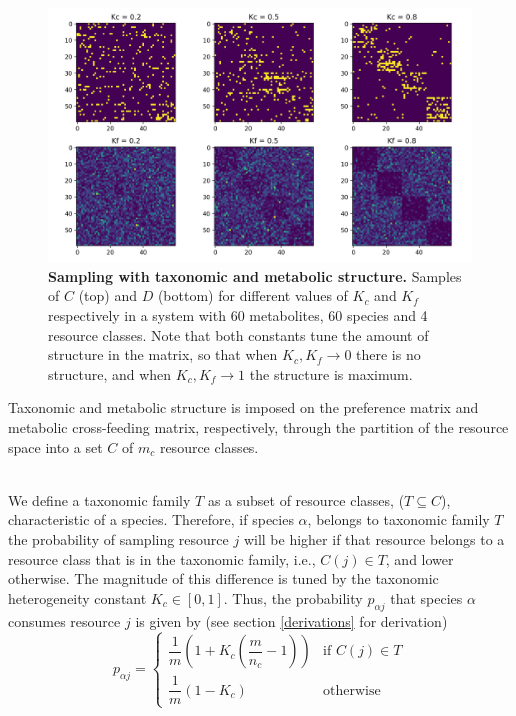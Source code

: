 \documentclass[12pt]{article}
\begin{document}
        	\begin{figure}[t]
        		\centering
        		\includegraphics[width=\textwidth]{kc_kf_guilds.png}
        		\caption{\textbf{Sampling with taxonomic and metabolic structure.} Samples of $C$ (top) and $D$ (bottom) for different values of $K_c$ and $K_f$ respectively in a system with 60 metabolites, 60 species and 4 resource classes. Note that both constants tune the amount of structure in the matrix, so that when $K_c, K_f \rightarrow 0$ there is no structure, and when $K_c, K_f \rightarrow 1$ the structure is maximum.}
        		\label{kc_kf_guilds}
        	\end{figure}
            Taxonomic and metabolic structure is imposed on the  preference matrix and metabolic cross-feeding matrix, respectively, through the partition of the resource space into a set $C$ of $m_c$ resource classes.\par\\
            We define a taxonomic family $T$ as a subset of resource classes, ($T \subseteq C$), characteristic of a species. Therefore, if species $\alpha$, belongs to taxonomic family $T$ the probability of sampling resource $j$ will be higher if  that resource belongs to a resource class that is in the taxonomic family, i.e., $C(j) \in T$, and lower otherwise. The magnitude of this difference is tuned by the taxonomic heterogeneity constant $K_c \in [0, 1]$. Thus, the probability $p_{\alpha j}$ that species $\alpha$ consumes resource $j$ is given by (see section \ref{derivations} for derivation)
            \begin{equation}\label{sampling_taxonomic}
                p_{\alpha j} = 
                \begin{cases}
                    \dfrac{1}{m}\left( 1 + K_c(\dfrac{m}{n_c} - 1) \right) & \text{if } C(j) \in T  \\
                    \dfrac{1}{m}(1-K_c) & \text{otherwise}
                \end{cases}
            \end{equation}
\end{document}
